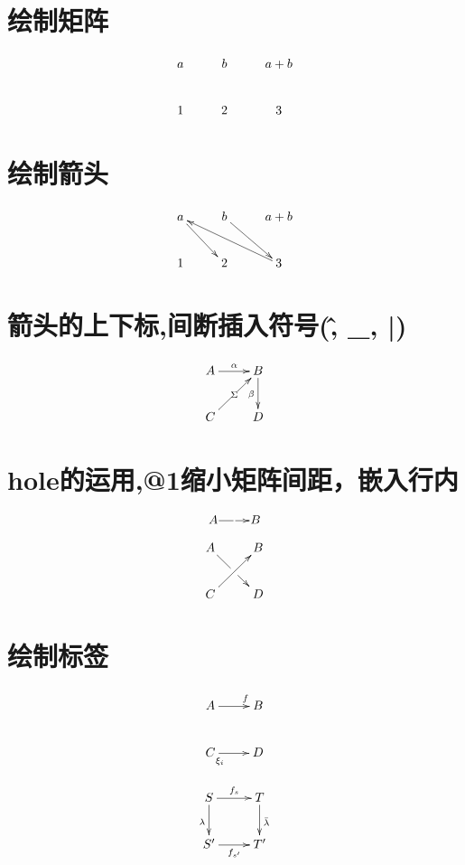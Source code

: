 \documentclass[fontset=windows, 12pt]{ctexart}
\begin{document}
	\tableofcontents
	\section{绘制矩阵}
	$$
	\xymatrix{
		a & b & a+b\\
		1 & 2 & 3 \\
	}
	$$

	\section{绘制箭头}
	$$
	\xymatrix{
		a & b\ar[rd] & a+b\\%
		1 & 2 & 3\ar"1,1" %
		\ar "1,1";"2,2" %
	}
	$$

	\section{箭头的上下标,间断插入符号(\^, \_, |)}
	$$
		\xymatrix{
			A\ar[r]^{\alpha} & B\ar[d]_{\beta}\\
			C\ar[ur]|{\Sigma} & D \\
		}
	$$

	\section{hole的运用,@1缩小矩阵间距，嵌入行内}
		$$
		\xymatrix@1{A\ar[r]|\hole & B}\\
		$$

		$$
		\xymatrix{
				A\ar[rd]|\hole & B \\
				C\ar[ur] & D \\
			}
		$$

	\section{绘制标签}
	$$
	\xymatrix{
		A \ar[r]^>>{f} & B\\
		C \ar[r]_(0.2){\xi_i} & D
	}
	$$

	\begin{equation}
		\begin{gathered}
			\xymatrix{
				S \ar[r]^{f_s} \ar[d]_{\lambda} 
				& T \ar[d]^{\bar\lambda}\\
				S' \ar[r]_{f_{s'}} & T'\\
			}	
		\end{gathered}
	\end{equation}
\end{document}
